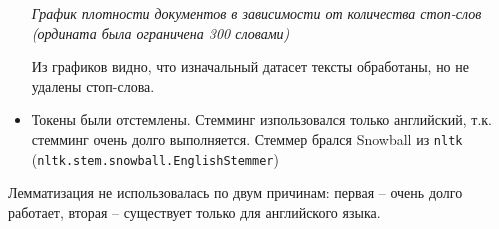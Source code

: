 \documentclass[12pt, a4paper]{article}
\begin{document}
\begin{itemize}
\begin{singlespace}
\begin{center}
                        \textit{График плотности документов в зависимости от количества стоп-слов (ордината была ограничена 300 словами)}
                    \end{center}
                \end{singlespace}

                Из графиков видно, что изначальный датасет тексты обработаны, но не удалены стоп-слова.

                \item Токены были отстемлены. Стемминг изпользовался только английский, т.к. стемминг очень долго выполняется. Стеммер брался Snowball из \verb|nltk|\\ (\verb|nltk.stem.snowball.EnglishStemmer|)
            \end{itemize}

            Лемматизация не использовалась по двум причинам: первая -- очень долго работает, вторая -- существует только для английского языка.
\end{document}

